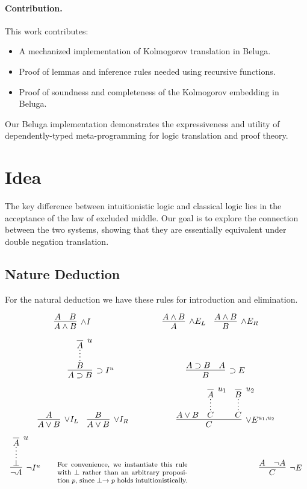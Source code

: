 \documentclass{article}
\begin{document}
\paragraph{Contribution.} This work contributes:
\begin{itemize}
    \item A mechanized implementation of Kolmogorov translation in Beluga.
    \item Proof of lemmas and inference rules needed using recursive functions.
    \item Proof of soundness and completeness of the Kolmogorov embedding in Beluga.
\end{itemize}
Our Beluga implementation demonstrates the expressiveness and utility of dependently-typed meta-programming for logic translation and proof theory.

\section{Idea}

The key difference between intuitionistic logic and classical logic lies in the acceptance of the law of excluded middle. Our goal is to explore the connection between the two systems, showing that they are essentially equivalent under double negation translation.


\subsection{Nature Deduction}
For the natural deduction we have these rules for
 introduction and elimination.

\[
\infer[\land I]{A \land B}{A & B}
\hspace{3cm}
\infer[\land E_L]{A}{A \land B}
\quad
\infer[\land E_R]{B}{A \land B}
\]


\[
\infer[\supset I^u]{A \supset B}{
  \infer*{B}{\infer [u]{A}{}}
}
\hspace{3cm}
\infer[\supset E]{B}{A \supset B & A}
\]



\[
\infer[\lor I_L]{A \lor B}{A}
\quad
\infer[\lor I_R]{A \lor B}{B}
\hspace{2cm}
\infer[\lor E^{u_1, u_2}]{C}{
  A \lor B
  \quad
  \infer*{C}{\infer[u_1]{A}{}}
  \quad
  \infer*{C}{\infer[u_2]{B}{}}
}
\]

\[
\infer[\neg I^{u}]{\neg A}{
  \infer*{\perp}{\infer[u]{A}{}}
}
\qquad
\parbox{0.45\linewidth}{\footnotesize
  For convenience, we instantiate this rule with $\perp$ rather than an arbitrary proposition $p$, since $\perp \rightarrow p$ holds intuitionistically.
}
\hspace{3cm}
\infer[\neg E]{C}{
   A & \neg A
}
\]
\end{document}
